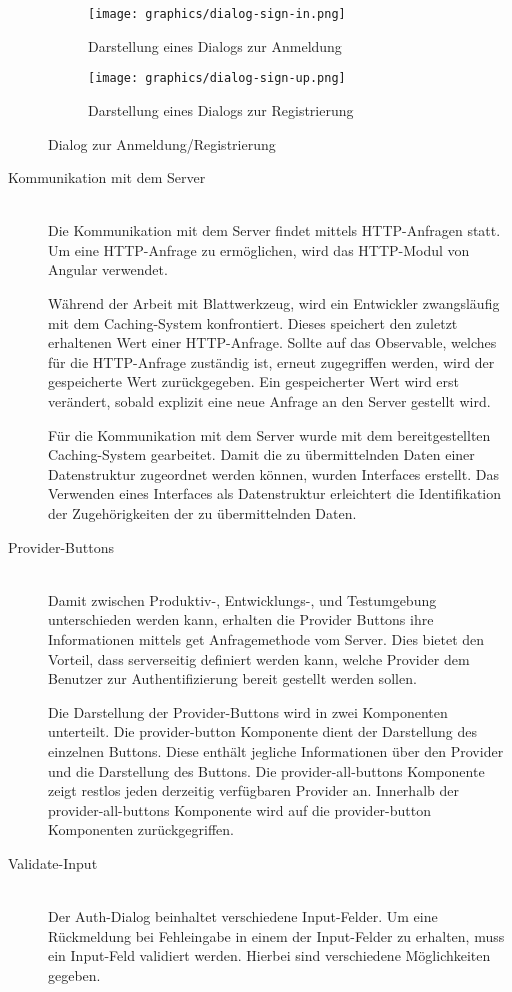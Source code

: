 \begin{figure}[h]
	\centering
	\begin{subfigure}{.5\textwidth}
		\texttt{[image: graphics/dialog-sign-in.png]}
		\caption{Darstellung eines Dialogs zur Anmeldung}
		\label{fig:dialog_sign_in}
	\end{subfigure}%
	\begin{subfigure}{.5\textwidth}
		\texttt{[image: graphics/dialog-sign-up.png]}
		\caption{Darstellung eines Dialogs zur Registrierung}
		\label{fig:dialog_sign_up}
	\end{subfigure}
	\caption{Dialog zur Anmeldung/Registrierung}
	\label{fig:auth-dialog}
\end{figure}

\begin{description}
	\item[Kommunikation mit dem Server]\hfill\\
	Die Kommunikation mit dem Server findet mittels \gls{HTTP}-Anfragen statt. Um eine \gls{HTTP}-Anfrage zu ermöglichen, wird das \gls{HTTP}-Modul von Angular verwendet.

	Während der Arbeit mit Blattwerkzeug, wird ein Entwickler zwangsläufig mit dem Caching-System konfrontiert. Dieses speichert den zuletzt erhaltenen Wert einer \gls{HTTP}-Anfrage. Sollte auf das Observable, welches für die \gls{HTTP}-Anfrage zuständig ist, erneut zugegriffen werden, wird der gespeicherte Wert zurückgegeben. Ein gespeicherter Wert wird erst verändert, sobald explizit eine neue Anfrage an den Server gestellt wird.
	
	Für die Kommunikation mit dem Server wurde mit dem bereitgestellten Caching-System gearbeitet. Damit die zu übermittelnden Daten einer Datenstruktur zugeordnet werden können, wurden Interfaces erstellt. Das Verwenden eines Interfaces als Datenstruktur erleichtert die Identifikation der Zugehörigkeiten der zu übermittelnden Daten. 

	\item[Provider-Buttons]\hfill\\
	Damit zwischen Produktiv-, Entwicklungs-, und Testumgebung unterschieden werden kann, erhalten die Provider Buttons ihre Informationen mittels get Anfragemethode vom Server. Dies bietet den Vorteil, dass serverseitig definiert werden kann, welche Provider dem Benutzer zur Authentifizierung bereit gestellt werden sollen.

	Die Darstellung der Provider-Buttons wird in zwei Komponenten unterteilt. Die provider-button Komponente dient der Darstellung des einzelnen Buttons. Diese enthält jegliche Informationen über den Provider und die Darstellung des Buttons. Die provider-all-buttons Komponente zeigt restlos jeden derzeitig verfügbaren Provider an. Innerhalb der provider-all-buttons Komponente wird auf die provider-button Komponenten zurückgegriffen.
	\item[Validate-Input]\hfill\\
	Der Auth-Dialog beinhaltet verschiedene Input-Felder. Um eine Rückmeldung bei Fehleingabe in einem der Input-Felder zu erhalten, muss ein Input-Feld validiert werden. Hierbei sind verschiedene Möglichkeiten gegeben.


\end{description}
